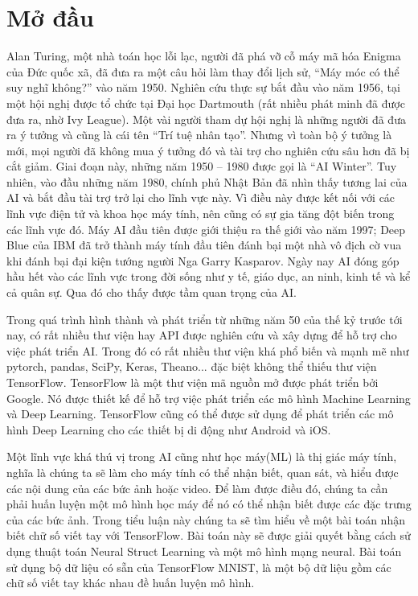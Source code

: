 
\chapter*{Mở đầu}




Alan Turing, một nhà toán học lỗi lạc, người đã phá vỡ cỗ máy mã hóa Enigma của Đức quốc xã, đã đưa ra một câu hỏi làm thay đổi lịch sử, “Máy móc có thể suy nghĩ không?” vào năm 1950. Nghiên cứu thực sự bắt đầu vào năm 1956, 
tại một hội nghị được tổ chức tại Đại học Dartmouth (rất nhiều phát minh đã được đưa ra, nhờ Ivy League). Một vài người tham dự hội nghị là những người đã đưa ra ý tưởng và cũng là cái tên “Trí tuệ nhân tạo”. Nhưng vì toàn bộ 
ý tưởng là mới, mọi người đã không mua ý tưởng đó và tài trợ cho nghiên cứu sâu hơn đã bị cắt giảm. Giai đoạn này, những năm 1950 – 1980 được gọi là “AI Winter”. Tuy nhiên, vào đầu những năm 1980, chính phủ Nhật Bản đã nhìn thấy 
tương lai của AI và bắt đầu tài trợ trở lại cho lĩnh vực này. Vì điều này được kết nối với các lĩnh vực điện tử và khoa học máy tính, nên cũng có sự gia tăng đột biến trong các lĩnh vực đó. Máy AI đầu tiên được giới thiệu ra thế 
giới vào năm 1997; Deep Blue của IBM đã trở thành máy tính đầu tiên đánh bại một nhà vô địch cờ vua khi đánh bại đại kiện tướng người Nga Garry Kasparov. Ngày nay AI đóng góp hầu hết vào các lĩnh vực trong đời sống như y tế, giáo 
dục, an ninh, kinh tế và kể cả quân sự. Qua đó cho thấy được tầm quan trọng của AI.

Trong quá trình hình thành và phát triển từ những năm 50 của thế kỷ trước tới nay, có rất nhiều thư viện hay API được nghiên cứu và xây dựng để hỗ trợ cho việc phát triển AI. Trong đó có rất nhiều thư viện
khá phổ biến và mạnh mẽ như pytorch, pandas, SciPy, Keras, Theano... đặc biệt không thể thiếu thư viện TensorFlow. TensorFlow là một thư viện mã nguồn mở được phát triển bởi Google. Nó được thiết kế để
hỗ trợ việc phát triển các mô hình Machine Learning và Deep Learning. TensorFlow cũng có thể được sử dụng để phát triển các mô hình Deep Learning cho các thiết bị di động như Android và iOS. 

Một lĩnh vực khá thú vị trong AI cũng như học máy(ML) là thị giác máy tính, nghĩa là chúng ta sẽ làm cho máy tính có thể nhận biết, quan sát, và hiểu được các nội dung của các bức ảnh hoặc video. Để làm được điều đó,
chúng ta cần phải huấn luyện một mô hình học máy để nó có thể nhận biết được các đặc trưng của các bức ảnh. Trong tiểu luận này chúng ta sẽ tìm hiểu về một bài toán nhận biết chữ số viết tay với TensorFlow. Bài toán này sẽ được 
giải quyết bằng cách sử dụng thuật toán Neural Struct Learning và một mô hình mạng neural. Bài toán sử dụng bộ dữ liệu có sẵn của TensorFlow MNIST, là một bộ dữ liệu gồm các chữ số viết tay khác nhau đề huấn luyện mô hình.

